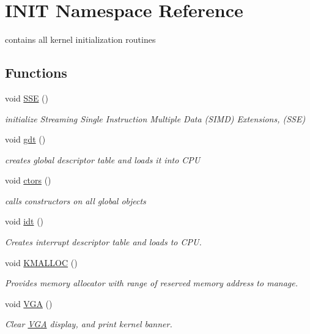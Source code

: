 \hypertarget{namespace_i_n_i_t}{}\section{I\+N\+IT Namespace Reference}
\label{namespace_i_n_i_t}


contains all kernel initialization routines  


\subsection*{Functions}
\begin{DoxyCompactItemize}
\item 
void \hyperlink{namespace_i_n_i_t_a8928ddbb4ca671dfe1c740da380fa0c4}{S\+SE} ()
\begin{DoxyCompactList}\small\item\em initialize Streaming Single Instruction Multiple Data (S\+I\+MD) Extensions, (S\+SE) \end{DoxyCompactList}\item 
void \hyperlink{namespace_i_n_i_t_a3462d7bc51bce77cc240d05b62b1b777}{gdt} ()
\begin{DoxyCompactList}\small\item\em creates global descriptor table and loads it into C\+PU \end{DoxyCompactList}\item 
void \hyperlink{namespace_i_n_i_t_a6608557e41ad37cdb4a408e2f05c9783}{ctors} ()
\begin{DoxyCompactList}\small\item\em calls constructors on all global objects \end{DoxyCompactList}\item 
void \hyperlink{namespace_i_n_i_t_aec8e9f01cb09653075b6e610096b3ca9}{idt} ()
\begin{DoxyCompactList}\small\item\em Creates interrupt descriptor table and loads to C\+PU. \end{DoxyCompactList}\item 
void \hyperlink{namespace_i_n_i_t_ac811302ce0948a6a097b445b811f9c14}{K\+M\+A\+L\+L\+OC} ()
\begin{DoxyCompactList}\small\item\em Provides memory allocator with range of reserved memory address to manage. \end{DoxyCompactList}\item 
void \hyperlink{namespace_i_n_i_t_abae5789d80f8edd37455f3b167779654}{V\+GA} ()
\begin{DoxyCompactList}\small\item\em Clear \hyperlink{namespace_v_g_a}{V\+GA} display, and print kernel banner. \end{DoxyCompactList}\end{DoxyCompactItemize}



